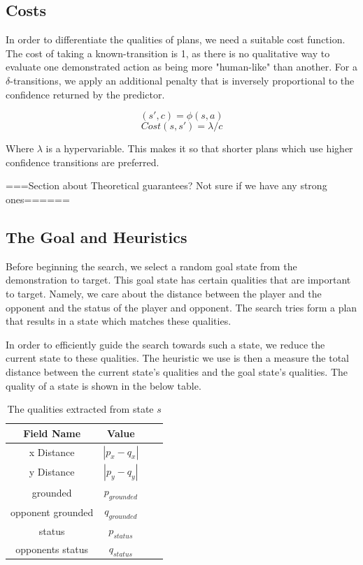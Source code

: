 
\subsection{Costs}

In order to differentiate the qualities of plans, we need a suitable cost function. The cost of taking a known-transition is 1, as there is no qualitative way to evaluate one demonstrated action as being more "human-like" than another. For a $\delta$-transitions, we apply an additional penalty that is inversely proportional to the confidence returned by the predictor.

$$(s',c) = \phi(s, a)$$
$$Cost(s, s') = \lambda/c$$

Where $\lambda$ is a hypervariable. This makes it so that shorter plans which use higher confidence transitions are preferred. 

===Section about Theoretical guarantees? Not sure if we have any strong ones======

\subsection{The Goal and Heuristics}

Before beginning the search, we select a random goal state from the demonstration to target. This goal state has certain qualities that are important to target. Namely, we care about the distance between the player and the opponent and the status of the player and opponent. The search tries form a plan that results in a state which matches these qualities. 

In order to efficiently guide the search towards such a state, we reduce the current state to these qualities. The heuristic we use is then a measure the total distance between the current state's qualities and the goal state's qualities. The quality of a state is shown in the below table.

\begin{table}[h]
	\centering
	\caption{The qualities extracted from state $s$}
	\begin{tabular}{| c | c | c | c |}
		\hline
		Field Name & Value\\
		\hline
		x Distance        			& $|p_x - q_x|$ \\
		\hline            			
		y Distance        			& $|p_y - q_y|$ 	\\
		\hline
		grounded        			& $p_{grounded}$ \\
		\hline
		opponent grounded       	& $q_{grounded}$ \\
		\hline
		status       				& $p_{status}$ \\
		\hline
		opponents status        	& $q_{status}$ \\
		\hline
	\end{tabular}
	\label{qualities}
\end{table}

